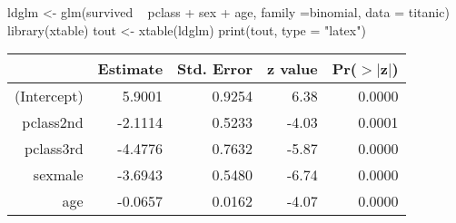 \begin{Schunk}
\begin{Sinput}
 ldglm <- glm(survived ~ pclass + sex + age, family =binomial, data = titanic)
 library(xtable)
 tout <- xtable(ldglm)
 print(tout, type = "latex")
\end{Sinput}
% latex table generated in R 3.0.1 by xtable 1.7-1 package
% Mon Jun 10 08:30:40 2013
\begin{table}[ht]
\centering
\begin{tabular}{rrrrr}
  \hline
 & Estimate & Std. Error & z value & Pr($>$$|$z$|$) \\ 
  \hline
(Intercept) & 5.9001 & 0.9254 & 6.38 & 0.0000 \\ 
  pclass2nd & -2.1114 & 0.5233 & -4.03 & 0.0001 \\ 
  pclass3rd & -4.4776 & 0.7632 & -5.87 & 0.0000 \\ 
  sexmale & -3.6943 & 0.5480 & -6.74 & 0.0000 \\ 
  age & -0.0657 & 0.0162 & -4.07 & 0.0000 \\ 
   \hline
\end{tabular}
\end{table}\end{Schunk}
